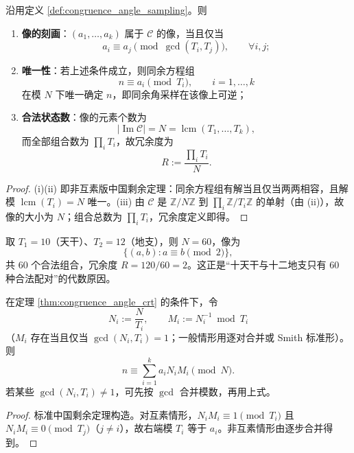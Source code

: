 \begin{theorem}[同余角采样与广义中国剩余定理]\label{thm:congruence_angle_crt}
沿用定义 \ref{def:congruence_angle_sampling}。则
\begin{enumerate}[label=(\roman*)]
    \item \textbf{像的刻画}：$(a_1,\dots,a_k)$ 属于 $\mathcal{C}$ 的像，当且仅当
    \[
    a_i\equiv a_j\pmod{\gcd(T_i,T_j)},\qquad\forall i,j;
    \]
    \item \textbf{唯一性}：若上述条件成立，则同余方程组
    \[
    n\equiv a_i\pmod{T_i},\qquad i=1,\dots,k
    \]
    在模 $N$ 下唯一确定 $n$，即同余角采样在该像上可逆；
    \item \textbf{合法状态数}：像的元素个数为
    \[
    |\operatorname{Im}\mathcal{C}|=N=\operatorname{lcm}(T_1,\dots,T_k),
    \]
    而全部组合数为 $\prod_i T_i$，故冗余度为
    \[
    R:=\frac{\prod_i T_i}{N}.
    \]
\end{enumerate}
\end{theorem}

\begin{proof}
(i)(ii) 即非互素版中国剩余定理：同余方程组有解当且仅当两两相容，且解模 $\operatorname{lcm}(T_i)=N$ 唯一。(iii) 由 $\mathcal{C}$ 是 $\mathbb{Z}/N\mathbb{Z}$ 到 $\prod_i\mathbb{Z}/T_i\mathbb{Z}$ 的单射（由 (ii)），故像的大小为 $N$；组合总数为 $\prod_i T_i$，冗余度定义即得。
\end{proof}

\begin{corollary}[六十甲子的同余角解释]\label{cor:sexagenary_congruence}
取 $T_1=10$（天干）、$T_2=12$（地支），则 $N=60$，像为
\[
\{(a,b):a\equiv b\pmod 2\},
\]
共 $60$ 个合法组合，冗余度 $R=120/60=2$。这正是“十天干与十二地支只有 $60$ 种合法配对”的代数原因。
\end{corollary}

\begin{theorem}[同余角重构的显式公式]\label{thm:congruence_angle_reconstruction}
在定理 \ref{thm:congruence_angle_crt} 的条件下，令
\[
N_i:=\frac{N}{T_i},\qquad M_i:=N_i^{-1}\bmod T_i
\]
（$M_i$ 存在当且仅当 $\gcd(N_i,T_i)=1$；一般情形用逐对合并或 Smith 标准形）。则
\[
n\equiv\sum_{i=1}^k a_i N_i M_i\pmod N.
\]
若某些 $\gcd(N_i,T_i)\ne1$，可先按 $\gcd$ 合并模数，再用上式。
\end{theorem}

\begin{proof}
标准中国剩余定理构造。对互素情形，$N_iM_i\equiv1\pmod{T_i}$ 且 $N_iM_i\equiv0\pmod{T_j}$（$j\ne i$），故右端模 $T_i$ 等于 $a_i$。非互素情形由逐步合并得到。
\end{proof}

